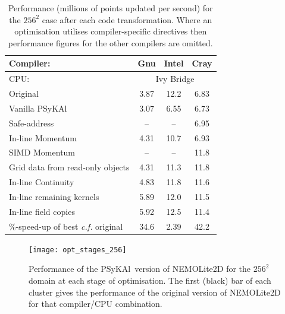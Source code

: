 \documentclass[journal]{IEEEtran}
\newcommand{\psykal}{{PS}y{KA}l}
\begin{document}
\begin{table}[!t]
\renewcommand{\arraystretch}{1.3}
\caption{Performance (millions of points updated per second) for the
  $256^2$ case after each code transformation. Where an optimisation
  utilises compiler-specific directives then performance figures for
  the other compilers are omitted.}
\label{TABLE_opt_breakdown}
\centering
\begin{tabular}{l|c|c|c}
\hline
Compiler:           & Gnu & Intel & Cray  \\
\hline
CPU:                & \multicolumn{3}{c}{Ivy Bridge}  \\
\hline
Original         & 3.87 & 12.2 & 6.83 \\
Vanilla \psykal  & 3.07 & 6.55 & 6.73 \\
Safe-address     & --   & --   & 6.95 \\
In-line Momentum & 4.31 & 10.7 & 6.93 \\
SIMD Momentum    & --   & --   & 11.8 \\
\parbox{2.5cm}{\raggedright Grid data from read-only objects} & 4.31 & 11.3 & 11.8 \\
In-line Continuity         & 4.83 & 11.8 & 11.6 \\
In-line remaining kernels  & 5.89 & 12.0 & 11.5 \\
In-line field copies       & 5.92 & 12.5 & 11.4 \\
\hline
\parbox{2.5cm}{\raggedright \%-speed-up of best {\it c.f.} original} & 34.6 & 2.39 & 42.2 \\
\hline
\end{tabular}
\end{table}

\begin{figure}[!t]
\centering
\texttt{[image: opt\_stages\_256]}
\caption{Performance of the \psykal\ version of NEMOLite2D for the
  $256^{2}$ domain at each stage of optimisation. The first (black)
  bar of each cluster gives the performance of the original version of
  NEMOLite2D for that compiler/CPU combination.}
\label{FIG_opt_stages_256}
\end{figure}

\end{document}
